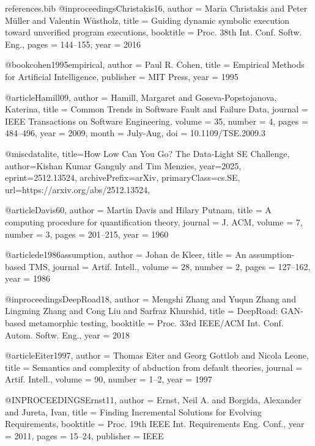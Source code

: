 \documentclass[runningheads]{llncs}
\begin{document}
\begin{filecontents}{references.bib}
@inproceedings{Christakis16,
  author    = {Maria Christakis and Peter M{\"u}ller and Valentin W{\"u}stholz},
  title     = {Guiding dynamic symbolic execution toward unverified program executions},
  booktitle = {Proc. 38th Int. Conf. Softw. Eng.},
  pages     = {144--155},
  year      = {2016}
}



@book{cohen1995empirical,
  author    = {Paul R. Cohen},
  title     = {Empirical Methods for Artificial Intelligence},
  publisher = {MIT Press},
  year      = {1995}
}

@article{Hamill09,
  author = {Hamill, Margaret and Goseva-Popstojanova, Katerina},
  title = {Common Trends in Software Fault and Failure Data},
  journal = {IEEE Transactions on Software Engineering},
  volume = {35},
  number = {4},
  pages = {484--496},
  year = {2009},
  month = {July-Aug},
  doi = {10.1109/TSE.2009.3}
}

 

@misc{datalite,
      title={How Low Can You Go? The Data-Light SE Challenge}, 
      author={Kishan Kumar Ganguly and Tim Menzies},
      year={2025},
      eprint={2512.13524},
      archivePrefix={arXiv},
      primaryClass={cs.SE},
      url={https://arxiv.org/abs/2512.13524}, 
}

@article{Davis60,
  author  = {Martin Davis and Hilary Putnam},
  title   = {A computing procedure for quantification theory},
  journal = {J. ACM},
  volume  = {7},
  number  = {3},
  pages   = {201--215},
  year    = {1960}
}



@article{de1986assumption,
  author  = {Johan de Kleer},
  title   = {An assumption-based TMS},
  journal = {Artif. Intell.},
  volume  = {28},
  number  = {2},
  pages   = {127--162},
  year    = {1986}
}



@inproceedings{DeepRoad18,
  author    = {Mengshi Zhang and Yuqun Zhang and Lingming Zhang and Cong Liu and Sarfraz Khurshid},
  title     = {DeepRoad: GAN-based metamorphic testing},
  booktitle = {Proc. 33rd IEEE/ACM Int. Conf. Autom. Softw. Eng.},
  year      = {2018}
}



@article{Eiter1997,
  author  = {Thomas Eiter and Georg Gottlob and Nicola Leone},
  title   = {Semantics and complexity of abduction from default theories},
  journal = {Artif. Intell.},
  volume  = {90},
  number  = {1--2},
  year    = {1997}
}


@INPROCEEDINGS{Ernst11,
  author    = {Ernst, Neil A. and Borgida, Alexander and Jureta, Ivan},
  title     = {Finding Incremental Solutions for Evolving Requirements},
  booktitle = {Proc. 19th IEEE Int. Requirements Eng. Conf.},
  year      = {2011},
  pages     = {15--24},
  publisher = {IEEE}
}


\end{filecontents}
\end{document}
